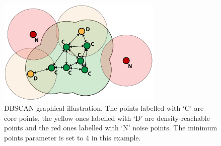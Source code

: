 \documentclass[lnicst,a4paper]{svmultln}
\begin{document}
\begin{figure}
 	\centerline{\includegraphics[width=0.7\textwidth]{dbscan1.pdf}}
	{\caption{DBSCAN graphical illustration.
	The points labelled with `C' are core points,
	the yellow ones labelled with `D' are density-reachable points
	and the red ones labelled with `N' noise points.
	The minimum points parameter is set to $4$ in this example.}\label{fig:dbscan_illustration1}}
\end{figure}
\end{document}
